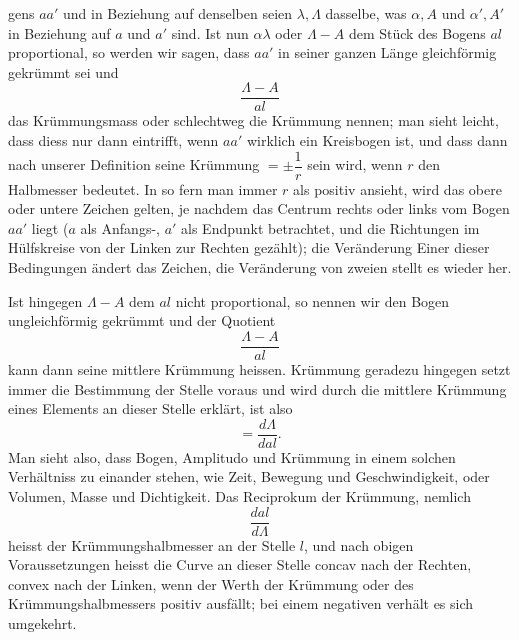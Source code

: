 %
gens $aa'$ und in Beziehung auf denselben seien $\lambda,\Lambda$ dasselbe, was $\alpha,A$ und $\alpha',A'$ in Beziehung auf $a$ und $a'$ sind. Ist nun $\alpha\lambda$ oder $\Lambda-A$ dem Stück des Bogens $al$ proportional, so werden wir sagen, dass $aa'$ in seiner ganzen Länge gleichförmig gekrümmt sei und
\[
\frac{\Lambda-A}{al}
\]
das Krümmungsmass oder schlechtweg die Krümmung nennen; man sieht leicht, dass diess nur dann eintrifft, wenn $aa'$ wirklich ein Kreisbogen ist, und dass dann nach unserer Definition seine Krümmung $=\pm\dfrac1r$ sein wird, wenn $r$ den Halbmesser bedeutet. In so fern man immer $r$ als positiv ansieht, wird das obere oder untere Zeichen gelten, je nachdem das Centrum rechts oder links vom Bogen $aa'$ liegt ($a$ als Anfangs-, $a'$ als Endpunkt betrachtet, und die Richtungen im Hülfskreise von der Linken zur Rechten gezählt); die Veränderung Einer dieser Bedingungen ändert das Zeichen, die Veränderung von zweien stellt es wieder her.

Ist hingegen $\Lambda-A$ dem $al$ nicht proportional, so nennen wir den Bogen ungleichförmig gekrümmt und der Quotient
\[
\frac{\Lambda-A}{al}
\]
kann dann seine mittlere Krümmung heissen. Krümmung geradezu hingegen setzt immer die Bestimmung der Stelle voraus und wird durch die mittlere Krümmung eines Elements an dieser Stelle erklärt, ist also
\[
=\frac{d\Lambda}{dal}.
\]
Man sieht also, dass Bogen, Amplitudo und Krümmung in einem solchen Verhältniss zu einander stehen, wie Zeit, Bewegung und Geschwindigkeit, oder Volumen, Masse und Dichtigkeit. Das Reciprokum der Krümmung, nemlich
\[
\frac{dal}{d\Lambda}
\]
heisst der Krümmungshalbmesser an der Stelle $l$, und nach obigen Voraussetzungen heisst die Curve an dieser Stelle concav nach der Rechten, convex nach der Linken, wenn der Werth der Krümmung oder des Krümmungshalbmessers positiv ausfällt; bei einem negativen verhält es sich umgekehrt.
